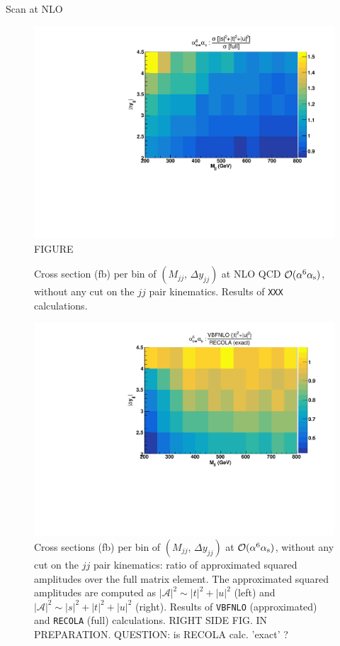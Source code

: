 Scan at NLO

\begin{figure}[hbt]
\centering
\includegraphics[scale=0.39]{figures/scanfigures/a6as_vbfnloVSrecola_stu.pdf}
FIGURE
\caption{Cross section (fb) per bin of $(M_{jj},\,\Delta y_{jj})$ at NLO QCD $\mathcal{O}(\alpha^6\alpha_\text{s})$, without any cut on the $jj$ pair kinematics. Results of \texttt{XXX} calculations.}\label{fig:mjjdyjj_2d_NLO}
\end{figure}


\begin{figure}[hbt]
\centering
\includegraphics[scale=0.395]{figures/scanfigures/a6as_vbfnloVSrecola_tu.pdf}
\caption{Cross sections (fb) per bin of $(M_{jj},\,\Delta y_{jj})$ at $\mathcal{O}(\alpha^6\alpha_\text{s})$, without any cut on the $jj$ pair kinematics: ratio of approximated squared amplitudes over the full matrix element. The approximated squared amplitudes are computed as $|\mathcal{A}|^2 \sim |t|^2 + |u|^2$ (left) and $|\mathcal{A}|^2 \sim |s|^2 + |t|^2 + |u|^2$ (right). Results of \texttt{VBFNLO} (approximated) and \texttt{RECOLA} (full) calculations. RIGHT SIDE FIG. IN PREPARATION. QUESTION: is RECOLA calc. 'exact' ?}\label{fig:ratio2d_NLO}
\end{figure}